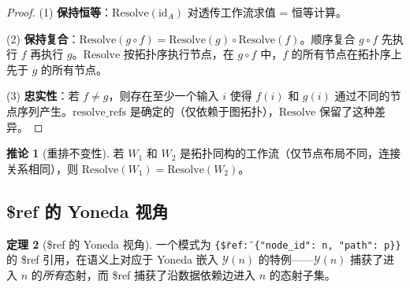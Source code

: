 \documentclass[11pt,a4paper]{article}
\theoremstyle{definition}
\newtheorem{theorem}{定理}[section]
\newtheorem{corollary}[theorem]{推论}
\theoremstyle{definition}
\theoremstyle{remark}
\newcommand{\id}{\mathrm{id}}
\newcommand{\Yoneda}{\mathcal{Y}}
\begin{document}
\begin{proof}
(1) \textbf{保持恒等}：$\mathrm{Resolve}(\id_A)$ 对透传工作流求值 = 恒等计算。\checkmark

(2) \textbf{保持复合}：$\mathrm{Resolve}(g \circ f) = \mathrm{Resolve}(g) \circ \mathrm{Resolve}(f)$。顺序复合 $g \circ f$ 先执行 $f$ 再执行 $g$。$\mathrm{Resolve}$ 按拓扑序执行节点，在 $g \circ f$ 中，$f$ 的所有节点在拓扑序上先于 $g$ 的所有节点。\checkmark

(3) \textbf{忠实性}：若 $f \neq g$，则存在至少一个输入 $i$ 使得 $f(i)$ 和 $g(i)$ 通过不同的节点序列产生。$\mathrm{resolve\_refs}$ 是确定的（仅依赖于图拓扑），$\mathrm{Resolve}$ 保留了这种差异。\checkmark
\end{proof}

\begin{corollary}[重排不变性]
若 $W_1$ 和 $W_2$ 是拓扑同构的工作流（仅节点布局不同，连接关系相同），则 $\mathrm{Resolve}(W_1) = \mathrm{Resolve}(W_2)$。
\end{corollary}

\subsection{\$ref 的 Yoneda 视角}

\begin{theorem}[\$ref 的 Yoneda 视角]
一个模式为 \texttt{\{\"\$ref\": \{"node\_id": n, "path": p\}\}} 的 \$ref 引用，在语义上对应于 Yoneda 嵌入 $\Yoneda(n)$ 的特例——$\Yoneda(n)$ 捕获了进入 $n$ 的\emph{所有}态射，而 \$ref 捕获了沿数据依赖边进入 $n$ 的态射子集。
\label{thm:yoneda-ref}
\end{theorem}
\end{document}
